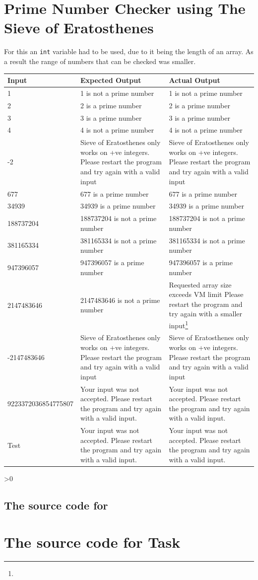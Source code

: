\documentclass[12pt,a4paper,onesided]{report}
\newcommand{\source}{\pagebreak
	\ifnum\value{section}>0
		\subsection{The source code for \thesection}

	\else
		\section{The source code for Task \thechapter}

	\fi
	}
\begin{document}
\section{Prime Number Checker using The Sieve of Eratosthenes}
For this an \lstinline|int| variable had to be used, due to it being the length of an array. As a result the range of numbers that can be checked was smaller.
\begin{table}[h!]
	\centering
	\begin{tabular}{lp{30ex}p{30ex}}
		\toprule Input & Expected Output & Actual Output\\
		\midrule
		1 & 1 is not a prime number& 1 is not a prime number\\
		2 & 2 is a prime number & 2 is a prime number\\
		3 & 3 is a prime number & 3 is a prime number\\
		4 & 4 is not a prime number & 4 is not a prime number\\
		-2 & Sieve of Eratosthenes only works on +ve integers. Please restart the program and try again with a valid input & Sieve of Eratosthenes only works on +ve integers. Please restart the program and try again with a valid input\\
		677 & 677 is a prime number & 677 is a prime number\\
		34939 & 34939 is a prime number & 34939 is a prime number\\
		188737204 & 188737204 is not a prime number & 188737204 is not a prime number\\
		381165334 & 381165334 is not a prime number & 381165334 is not a prime number\\
		947396057 & 947396057 is a prime number & 947396057 is a prime number\\
		2147483646& 2147483646 is not a prime number & Requested array size exceeds VM limit Please restart the program and try again with a smaller input\footnote{} \\ 
		-2147483646 & Sieve of Eratosthenes only works on +ve integers. Please restart the program and try again with a valid input & Sieve of Eratosthenes only works on +ve integers. Please restart the program and try again with a valid input\\
		9223372036854775807 & Your input was not accepted. Please restart the program and try again with a valid input.
		 & Your input was not accepted. Please restart the program and try again with a valid input.\\
		Test & Your input was not accepted. Please restart the program and try again with a valid input.
		& Your input was not accepted. Please restart the program and try again with a valid input.\\
		
		\bottomrule
	\end{tabular}
\end{table}
\source
\printbibliography[title={References}]
\end{document}
